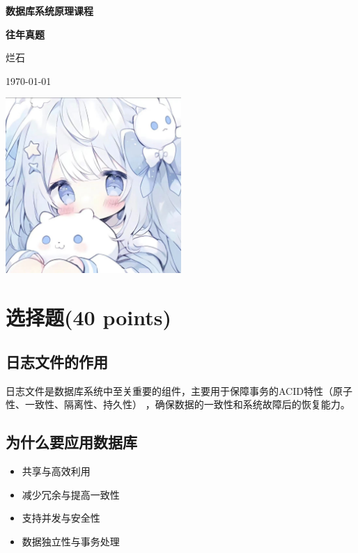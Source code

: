 \documentclass[a4paper,12pt,UTF8,fontset=none]{ctexart}
\begin{document}
\begin{titlepage}
    \centering
    \vspace*{\fill}
    {\LARGE\bfseries 数据库系统原理课程\par}
    \vspace{2cm}
    {\Huge\bfseries 往年真题\par}
    \vspace{2cm}
    {\Large 烂石\par}
    \vspace{1cm}
    {\large \today \par}
    \vspace{4cm}
    \includegraphics[width=0.5\textwidth]{images/logo.jpg}
    \vspace*{\fill}
    \thispagestyle{empty} %
    \newpage
\end{titlepage}

\section{选择题(40 points)}
\subsection{日志文件的作用}
日志文件是数据库系统中至关重要的组件，主要用于保障事务的ACID特性（原子性、一致性、隔离性、持久性） ，确保数据的一致性和系统故障后的恢复能力。
\subsection{为什么要应用数据库}
\begin{itemize}
    \item 共享与高效利用
    \item 减少冗余与提高一致性
    \item 支持并发与安全性
    \item 数据独立性与事务处理
\end{itemize}
\end{document}
